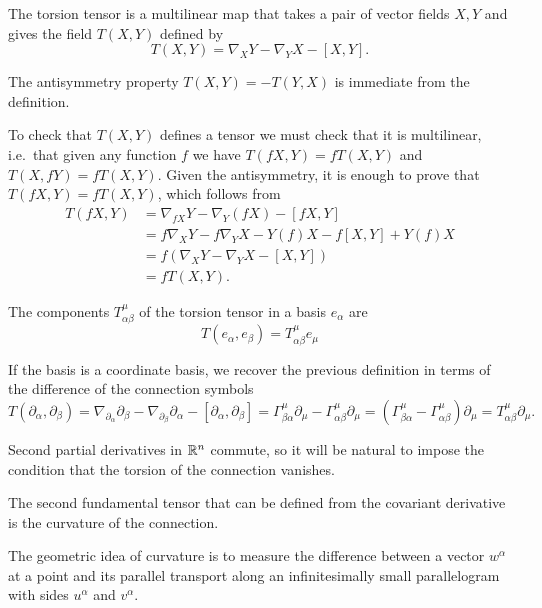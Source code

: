 \begin{points}
\item The torsion tensor is a multilinear map that takes a pair of vector fields $X,Y$ and gives the field $T(X,Y)$ defined by
\[
  T(X,Y)=\nabla_XY-\nabla_YX-[X,Y].
\]

\item The antisymmetry property $T(X,Y)=-T(Y,X)$ is immediate from the definition.

\item To check that $T(X,Y)$ defines a tensor we must check that it is multilinear, i.e.\ that given any function $f$ we have $T(fX,Y)=fT(X,Y)$ and $T(X,fY)=fT(X,Y)$. Given the antisymmetry, it is enough to prove that $T(fX,Y)=fT(X,Y)$, which follows from
\begin{align*}
  T(fX,Y)&=\nabla_{fX}Y-\nabla_Y(fX)-[fX,Y]\\
  &=f\nabla_XY-f\nabla_YX-Y(f)X-f[X,Y]+Y(f)X\\
  &=f\left(\nabla_XY-\nabla_YX-[X,Y]\right)\\
  &=fT(X,Y).
\end{align*}

\item The components $T^\mu_{\alpha\beta}$ of the torsion tensor in a basis $e_\alpha$ are
\[
  T(e_\alpha,e_\beta)=T^\mu_{\alpha\beta}e_\mu
\]

\item If the basis is a coordinate basis, we recover the previous definition in terms of the difference of the connection symbols
\[
  T(\partial_\alpha,\partial_\beta)=\nabla_{\partial_\alpha}\partial_\beta-\nabla_{\partial_\beta}\partial_\alpha-[\partial_\alpha,\partial_\beta]=\Gamma^\mu_{\beta\alpha}\partial_\mu-\Gamma^\mu_{\alpha\beta}\partial_\mu=\left(\Gamma^\mu_{\beta\alpha}-\Gamma^\mu_{\alpha\beta}\right)\partial_\mu=T^\mu_{\alpha\beta}\partial_\mu .
\]

\item Second partial derivatives in $\mathbb{R}^n$ commute, so it will be natural to impose the condition that the torsion of the connection vanishes.

\item The second fundamental tensor that can be defined from the covariant derivative is the curvature of the connection.

\item The geometric idea of curvature is to measure the difference between a vector $w^\alpha$ at a point and its parallel transport along an infinitesimally small parallelogram with sides $u^\alpha$ and $v^\alpha$.


\end{points}

